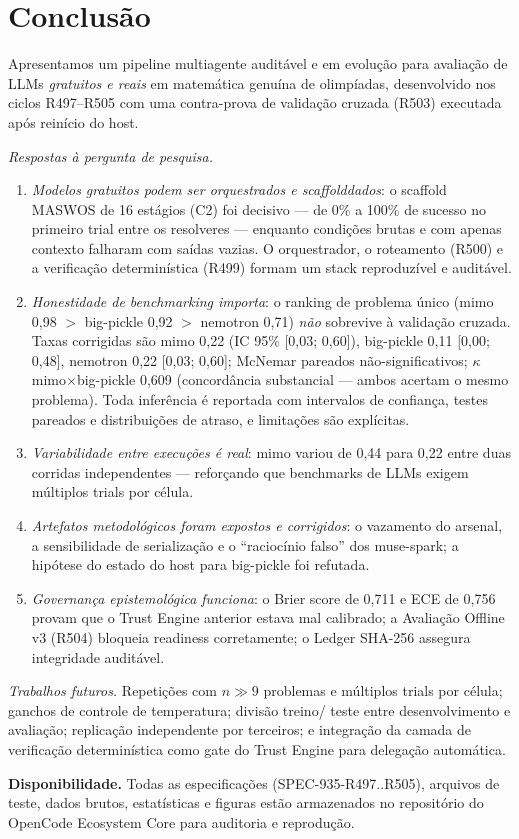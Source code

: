 \section{Conclusão}
\label{sec:conclusion}

Apresentamos um pipeline multiagente auditável e em evolução para avaliação
de LLMs \emph{gratuitos e reais} em matemática genuína de olimpíadas,
desenvolvido nos ciclos R497--R505 com uma contra-prova de validação cruzada
(R503) executada após reinício do host.

\emph{Respostas à pergunta de pesquisa.}
\begin{enumerate}
\item \emph{Modelos gratuitos podem ser orquestrados e scaffolddados}: o
scaffold MASWOS de 16 estágios (C2) foi decisivo --- de 0\% a 100\% de
sucesso no primeiro trial entre os resolveres --- enquanto condições brutas
e com apenas contexto falharam com saídas vazias. O orquestrador, o
roteamento (R500) e a verificação determinística (R499) formam um stack
reproduzível e auditável.
\item \emph{Honestidade de benchmarking importa}: o ranking de problema
único (mimo 0,98 $>$ big-pickle 0,92 $>$ nemotron 0,71) \emph{não}
sobrevive à validação cruzada. Taxas corrigidas são mimo 0,22 (IC 95\%
[0,03; 0,60]), big-pickle 0,11 [0,00; 0,48], nemotron 0,22 [0,03; 0,60];
McNemar pareados não-significativos; $\kappa$ mimo$\times$big-pickle 0,609
(concordância substancial --- ambos acertam o mesmo problema). Toda inferência
é reportada com intervalos de confiança, testes pareados e distribuições de
atraso, e limitações são explícitas.
\item \emph{Variabilidade entre execuções é real}: mimo variou de 0,44 para
0,22 entre duas corridas independentes --- reforçando que benchmarks de LLMs
exigem múltiplos trials por célula.
\item \emph{Artefatos metodológicos foram expostos e corrigidos}: o vazamento
do arsenal, a sensibilidade de serialização e o ``raciocínio falso'' dos
muse-spark; a hipótese do estado do host para big-pickle foi refutada.
\item \emph{Governança epistemológica funciona}: o Brier score de 0,711 e
ECE de 0,756 provam que o Trust Engine anterior estava mal calibrado; a
Avaliação Offline v3 (R504) bloqueia readiness corretamente; o Ledger
SHA-256 assegura integridade auditável.
\end{enumerate}

\emph{Trabalhos futuros.} Repetições com $n \gg 9$ problemas e múltiplos
trials por célula; ganchos de controle de temperatura; divisão treino/
teste entre desenvolvimento e avaliação; replicação independente por
terceiros; e integração da camada de verificação determinística como gate
do Trust Engine para delegação automática.

\textbf{Disponibilidade.} Todas as especificações (SPEC-935-R497..R505),
arquivos de teste, dados brutos, estatísticas e figuras estão armazenados
no repositório do OpenCode Ecosystem Core para auditoria e reprodução.